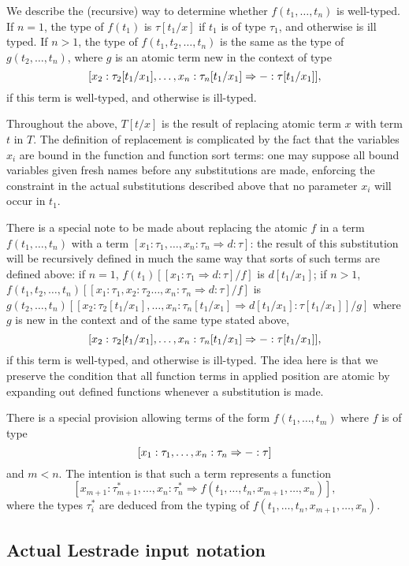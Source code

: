 \documentclass[12pt]{article}
\begin{document}
We describe the (recursive) way to determine whether $f(t_1,\ldots,t_n)$ is well-typed.  If $n=1$,
the type of $f(t_1)$ is $\tau[t_1/x]$ if $t_1$ is of type $\tau_1$, and otherwise is ill typed.  If $n>1$,
the type of $f(t_1,t_2,\ldots,t_n)$ is the same as the type of $g(t_2,\ldots,t_n)$, where $g$ is an atomic term new in the context
of type $$[x_2:\tau_2[t_1/x_1],\ldots,x_n:\tau_n[t_1/x_1]\Rightarrow {\tt -}:\tau[t_1/x_1]],$$ if this term is well-typed, and otherwise is ill-typed.

Throughout the above, $T[t/x]$ is the result of replacing atomic term $x$ with term $t$ in $T$.  The definition of replacement is complicated by the fact that the variables $x_i$ are bound in the function and function sort terms:  one may suppose all bound variables given fresh names before any substitutions are made, enforcing the constraint in the actual substitutions described above that no parameter $x_i$ will occur in $t_1$.

There is a special note to be made about replacing the atomic $f$ in a term $f(t_1,\ldots,t_n)$ with a term 
$[x_1:\tau_1,\ldots,x_n:\tau_n \Rightarrow d:\tau]$:  the result of this substitution will be recursively defined in
much the same way that sorts of such terms are defined above:  if $n=1$, $f(t_1)[[x_1:\tau_1 \Rightarrow d:\tau]/f]$
is $d[t_1/x_1]$;  if $n>1$, $f(t_1,t_2,\ldots,t_n)[[x_1:\tau_1,x_2:\tau_2\ldots, x_n:\tau_n\Rightarrow d:\tau]/f]$
is $g(t_2,\ldots,t_n)[[x_2:\tau_2[t_1/x_1],\ldots, x_n:\tau_n[t_1/x_1]\Rightarrow d[t_1/x_1]:\tau[t_1/x_1]]/g]$  where $g$ is new in the context and of the same type stated above, $$[x_2:\tau_2[t_1/x_1],\ldots,x_n:\tau_n[t_1/x_1]\Rightarrow {\tt -}:\tau[t_1/x_1]],$$ if this term is well-typed, and otherwise is ill-typed.  The idea here is that we preserve the condition that all function terms in applied position are atomic by expanding out defined functions whenever a substitution is made.

There is a special provision allowing terms of the form $f(t_1,\ldots,t_m)$ where $f$ is of type $$[x_1:\tau_1,\ldots,x_n:\tau_n \Rightarrow {\tt -}:\tau]$$ and $m<n$.  The intention is that such a term represents a function
$$[x_{m+1}:\tau^*_{m+1},\ldots,x_n:\tau^*_n \Rightarrow f(t_1,\ldots,t_n,x_{m+1},\ldots,x_n)],$$ where the types
$\tau^*_i$ are deduced from the typing of $f(t_1,\ldots,t_n,x_{m+1},\ldots,x_n)$.

\subsection{Actual Lestrade input notation}
\end{document}
